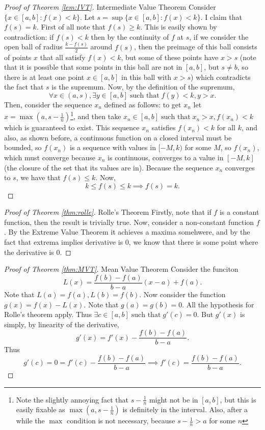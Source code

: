 \documentclass{article}[11pt]
\DeclareMathOperator{\st}{\text{ such that }}
\begin{document}
\begin{proof}[Proof of Theorem \ref{lem:IVT}]{Intermediate Value Theorem}
	Consider $\{x \in [a, b] : f(x) < k \}$. 
	Let $s = \sup \{x \in [a, b] : f(x) < k \}$. 
	I claim that $f(s) = k$. 
	First of all note that $f(s) \ge k$. This is easily shown by contradiction: if $f(s) < k$ then by the continuity of $f$ at $s$, if we consider the open ball of radius $\frac{k - f(s)}{2}$ around $f(s)$, then the preimage of this ball consists of points $x$ that all satisfy $f(x) < k$, but some of these points have $x>s$	(note that it is possible that some points in this ball are not in $[a,b]$, but $s \neq b$, so there is at least one point $x \in [a,b]$ in this ball with $x > s$) which contradicts the fact that $s$ is the supremum.
	Now, by the definition of the supremum, 
	$$\forall x \in (a, s), \exists y \in [a,b] \st f(y) < k, y > x.$$
Then, consider the sequence $x_n$ defined as follows: to get $x_n$ let $x=\max(a, s-\frac{1}{n})$\footnote{Note the slightly annoying fact that $s-\frac{1}{n}$ might not be in $[a,b]$, but this is easily fixable as $\max(a, s-\frac{1}{n})$ is definitely in the interval. Also, after a while the $\max$ condition is not necessary, because $s-\frac{1}{n}>a$ for some $n$}, and then take $x_n \in [a, b] \st x_n > x, f(x_n) < k$ which is guaranteed to exist. 
This sequence $x_n$ satisfies $f(x_n) < k$ for all $k$, and also, as shown before, a continuous function on a closed interval must be bounded, so $f(x_n)$ is a sequence with values in $[-M, k)$ for some $M$, so $f(x_n)$, which must converge because $x_n$ is continuous, converges to a value in $[-M, k]$ (the closure of the set that its values are in). Because the sequence $x_n$ converges to $s$, we have that $f(s) \le k$.
Now, 
$$k \le f(s) \le k\implies f(s) = k.$$
\end{proof} 

\begin{proof}[Proof of Theorem \ref{thm:rolle}]{Rolle's Theorem}
	Firstly, note that if $f$ is a constant function, then the result is trivially true.
	Now, consider a non-constant function $f$. By the Extreme Value Theorem it achieves a maxima somehwere, and by the fact that extrema implies derivative is $0$, we know that there is some point where the derivative is $0$.
\end{proof}

\begin{proof}[Proof of Theorem \ref{thm:MVT}]{Mean Value Theorem}
	Consider the funciton $$L(x) = \frac{f(b)-f(a)}{b-a}(x-a)+f(a).$$
	Note that $L(a) = f(a), L(b) = f(b).$
	Now consider the function $g(x) = f(x) - L(x).$
	Note that $g(a) = g(b) = 0.$
	All the hypothesis for Rolle's theorem apply. Thus $\exists c \in [a,b ] \st g'(c) = 0$.
	But $g'(x) $ is simply, by linearity of the derivative,
	$$g'(x) = f'(x) - \frac{f(b)-f(a)}{b-a}.$$
	Thus
	$$g'(c) = 0 = f'(c) - \frac{f(b)-f(a)}{b-a} \implies f'(c) = \frac{f(b)-f(a)}{b-a}.$$
\end{proof}
\end{document}
